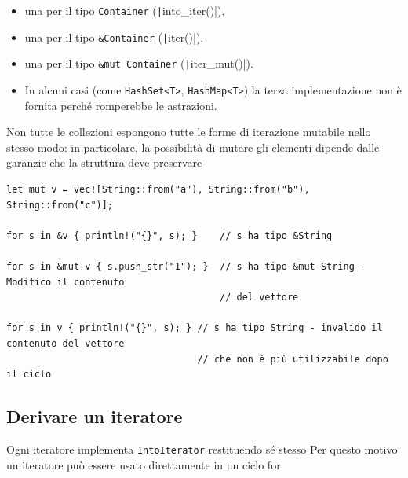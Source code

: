 \begin{itemize}
  \item una per il tipo \verb|Container| (\texttt|into_iter()|),
  \item una per il tipo \verb|&Container| (\texttt|iter()|),
  \item una per il tipo \verb|&mut Container| (\texttt|iter_mut()|).
  \item In alcuni casi (come \verb|HashSet<T>|, \verb|HashMap<T>|) la terza implementazione non è
        fornita perché romperebbe le astrazioni.
\end{itemize}
Non tutte le collezioni espongono tutte le forme di iterazione mutabile nello stesso modo: in
particolare, la possibilità di mutare gli elementi dipende dalle garanzie che la struttura deve
preservare

\begin{verbatim}
let mut v = vec![String::from("a"), String::from("b"), String::from("c")];

for s in &v { println!("{}", s); }    // s ha tipo &String 

for s in &mut v { s.push_str("1"); }  // s ha tipo &mut String - Modifico il contenuto 
                                      // del vettore 

for s in v { println!("{}", s); } // s ha tipo String - invalido il contenuto del vettore 
                                  // che non è più utilizzabile dopo il ciclo
\end{verbatim}

\subsection{Derivare un iteratore}

Ogni iteratore implementa \verb|IntoIterator| restituendo sé stesso
Per questo motivo un iteratore può essere usato direttamente in un ciclo for

